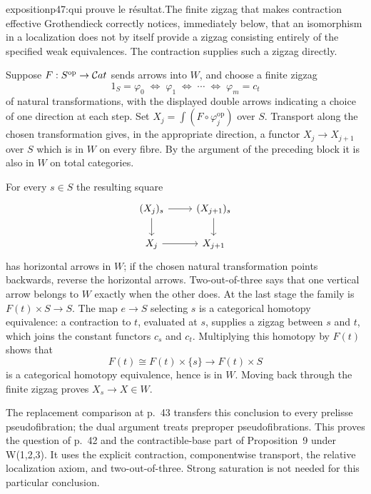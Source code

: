 \begin{dcomment}{exposition}{p47:qui prouve le résultat.}{The finite zigzag that makes contraction effective}
Grothendieck correctly notices, immediately below, that an isomorphism in a localization does not by itself provide a zigzag consisting entirely of the specified weak equivalences. The contraction supplies such a zigzag directly.

Suppose $F:S^{\mathrm{op}}\to\mathcal{C}at$ sends arrows into $W$, and choose a finite zigzag
\[
 1_S=\varphi_0\;\Longleftrightarrow\;\varphi_1
 \;\Longleftrightarrow\;\cdots
 \;\Longleftrightarrow\;\varphi_m=c_t
\]
of natural transformations, with the displayed double arrows indicating a choice of one direction at each step. Set $X_j=\int(F\circ\varphi_j^{\mathrm{op}})$ over $S$. Transport along the chosen transformation gives, in the appropriate direction, a functor $X_j\to X_{j+1}$ over $S$ which is in $W$ on every fibre. By the argument of the preceding block it is also in $W$ on total categories.

For every $s\in S$ the resulting square
\[
\begin{tikzcd}
 (X_j)_s\arrow[r]\arrow[d] & (X_{j+1})_s\arrow[d]\\
 X_j\arrow[r] & X_{j+1}
\end{tikzcd}
\]
has horizontal arrows in $W$; if the chosen natural transformation points backwards, reverse the horizontal arrows. Two-out-of-three says that one vertical arrow belongs to $W$ exactly when the other does. At the last stage the family is $F(t)\times S\to S$. The map $e\to S$ selecting $s$ is a categorical homotopy equivalence: a contraction to $t$, evaluated at $s$, supplies a zigzag between $s$ and $t$, which joins the constant functors $c_s$ and $c_t$. Multiplying this homotopy by $F(t)$ shows that
\[
 F(t)\cong F(t)\times\{s\}\longrightarrow F(t)\times S
\]
is a categorical homotopy equivalence, hence is in $W$. Moving back through the finite zigzag proves $X_s\to X\in W$.

The replacement comparison at p.~43 transfers this conclusion to every prelisse pseudofibration; the dual argument treats preproper pseudofibrations. This proves the question of p.~42 and the contractible-base part of Proposition~9 under W(1,2,3). It uses the explicit contraction, componentwise transport, the relative localization axiom, and two-out-of-three. Strong saturation is not needed for this particular conclusion.
\end{dcomment}


